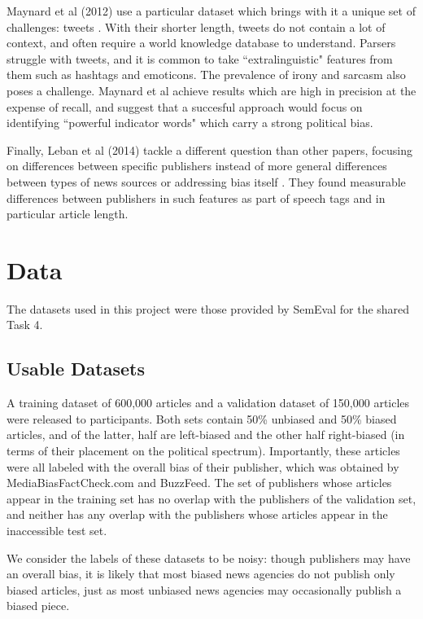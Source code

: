 \documentclass[11pt, a4paper]{article}
\begin{document}
Maynard et al (2012) use a particular dataset which brings with it a unique set of challenges: tweets \cite{maynard2012automatic}. With their shorter length, tweets do not contain a lot of context, and often require a world knowledge database to understand. Parsers struggle with tweets, and it is common to take ``extralinguistic" features from them such as hashtags and emoticons. The prevalence of irony and sarcasm also poses a challenge. Maynard et al achieve results which are high in precision at the expense of recall, and suggest that a succesful approach would focus on identifying ``powerful indicator words" which carry a strong political bias.

Finally, Leban et al (2014) tackle a different question than other papers, focusing on differences between specific publishers instead of more general differences between types of news sources or addressing bias itself \cite{leban2014news}. They found measurable differences between publishers in such features as part of speech tags and in particular article length.

\section{Data}

The datasets used in this project were those provided by SemEval for the shared Task 4.

\subsection{Usable Datasets}

A training dataset of 600,000 articles and a validation dataset of 150,000 articles were released to participants. Both sets contain 50\% unbiased and 50\% biased articles, and of the latter, half are left-biased and the other half right-biased (in terms of their placement on the political spectrum). Importantly, these articles were all labeled with the overall bias of their publisher, which was obtained by MediaBiasFactCheck.com and BuzzFeed. The set of publishers whose articles appear in the training set has no overlap with the publishers of the validation set, and neither has any overlap with the publishers whose articles appear in the inaccessible test set.

We consider the labels of these datasets to be noisy: though publishers may have an overall bias, it is likely that most biased news agencies do not publish only biased articles, just as most unbiased news agencies may occasionally publish a biased piece.
\end{document}
